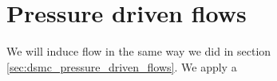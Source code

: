 \section{Pressure driven flows}
\label{md:pressure_driven_flows}
We will induce flow in the same way we did in section \ref{sec:dsmc_pressure_driven_flows}. We apply a 